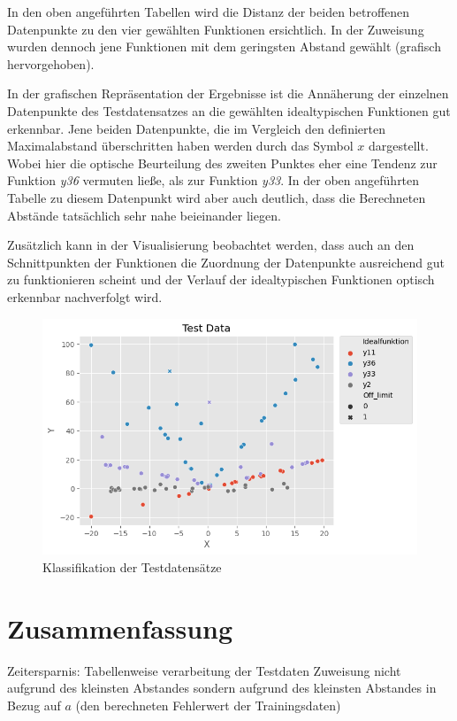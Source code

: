 In den oben angeführten Tabellen wird die Distanz der beiden betroffenen Datenpunkte zu den vier gewählten Funktionen ersichtlich. In der Zuweisung wurden dennoch jene Funktionen mit dem geringsten Abstand gewählt (grafisch hervorgehoben).

In der grafischen Repräsentation der Ergebnisse ist die Annäherung der einzelnen Datenpunkte des Testdatensatzes an die gewählten idealtypischen Funktionen gut erkennbar. Jene beiden Datenpunkte, die im Vergleich den definierten Maximalabstand überschritten haben werden durch das Symbol $x$ dargestellt. Wobei hier die optische Beurteilung des zweiten Punktes eher eine Tendenz zur Funktion \emph{y36} vermuten ließe, als zur Funktion \emph{y33}. In der oben angeführten Tabelle zu diesem Datenpunkt wird aber auch deutlich, dass die Berechneten Abstände tatsächlich sehr nahe beieinander liegen.

Zusätzlich kann in der Visualisierung beobachtet werden, dass auch an den Schnittpunkten der Funktionen die Zuordnung der Datenpunkte ausreichend gut zu funktionieren scheint und der Verlauf der idealtypischen Funktionen optisch erkennbar nachverfolgt wird.


\begin{figure}[h]
\centering
\includegraphics[width=12cm]{../output/figures/test.png}
\caption{Klassifikation der Testdatensätze \cite{Gage:18}}\label{fig:test}
\end{figure}


\chapter{Zusammenfassung}

Zeitersparnis: Tabellenweise verarbeitung der Testdaten
Zuweisung nicht aufgrund des kleinsten Abstandes sondern aufgrund des kleinsten Abstandes in Bezug auf $a$ (den berechneten Fehlerwert der Trainingsdaten)



